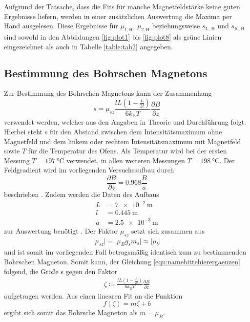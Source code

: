 Aufgrund der Tatsache, dass die Fits für manche Magnetfeldstärke keine guten Ergebnisse liefern, werden in einer zusätzlichen Auswertung die Maxima per Hand ausgelesen.
Diese Ergebnisse für $\mu_{1, \text{H}}$, $\mu_{2, \text{H}}$ beziehungsweise $s_\text{L, H}$ und $s_\text{R, H}$ sind sowohl in den Abbildungen \ref{fig:plot1} bis \ref{fig:plot8} als grüne Linien eingezeichnet als auch in Tabelle \ref{table:tab2} angegeben.


\subsection{Bestimmung des Bohrschen Magnetons}

Zur Bestimmung des Bohrschen Magnetons kann der Zusammenhang
\begin{equation}
  \label{eqn:namebittehierergaenzen}
  s = \mu_{sz} \frac{l L \left( 1 - \frac{L}{2l} \right)}{6 k_\text{B} T} \frac{\partial B}{\partial z}
\end{equation}
verwendet werden, welcher aus den Angaben in Theorie und Durchführung folgt.
Hierbei steht s für den Abstand zwischen dem Intensitätsmaximum ohne Magnetfeld und dem linkem oder rechtem Intensitätsmaximum mit Magnetfeld sowie $T$ für die Temperatur des Ofens.
Als Temperatur wird bei der ersten Messung $T = \SI{197}{\celsius}$ verwendet, in allen weiteren Messungen $T = \SI{198}{\celsius}$.
Der Feldgradient wird im vorliegenden Versuchsaufbau durch
\begin{equation}
  \frac{\partial B}{\partial z} = \num{0.968} \frac{B}{a}
\end{equation}
beschrieben \cite{skript}.
Zudem werden die Daten des Aufbaus
\begin{align*}
  L &= \SI{7e-2}{\metre}\\
  l &= \SI{0.445}{\metre}\\
  a &= \SI{2.5e-3}{\metre}
\end{align*}
zur Auswertung benötigt \cite{skript}.
Der Faktor $\mu_{sz}$ setzt sich zusammen aus
\begin{align*}
  \lvert \mu_{sz} \rvert = \lvert \mu_B g_s m_s \rvert \approx \lvert \mu_b \rvert
\end{align*}
und ist somit im vorliegenden Fall betragsmäßig identisch zum zu bestimmenden Bohrschen Magneton.
Somit kann, der Gleichung \eqref{eqn:namebittehierergaenzen} folgend, die Größe s gegen den Faktor
\begin{align*}
  \zeta \coloneq \frac{l L \left( 1 - \frac{L}{2l} \right)}{6 k_\text{B} T} \frac{\partial B}{\partial z}
\end{align*}
aufgetragen werden.
Aus einen linearen Fit an die Funktion
\begin{equation}
  f(\zeta) = m \zeta + b
\end{equation}
ergibt sich somit das Bohrsche Magneton als $m = \mu_B$.

